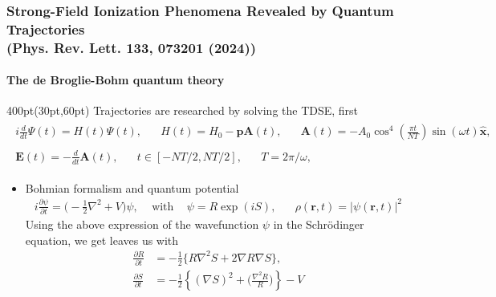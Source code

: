 \begin{frame}
\frametitle{Strong-Field Ionization Phenomena Revealed by Quantum Trajectories \\
\small (Phys. Rev. Lett. \textbf{133}, 073201 (2024))}
\framesubtitle{The de Broglie-Bohm quantum theory}


\footnotesize
 
\begin{textblock*}{400pt}(30pt,60pt)
Trajectories are researched by solving the TDSE, first
\begin{align}
\begin{split}
 i\frac{d}{dt}\Psi(t) = H(t)\Psi(t), 
   \hspace{20pt} H(t) = H_0 - \boldsymbol{p}\boldsymbol{A}(t), \hspace{20pt}
\boldsymbol{A}(t) = -A_0 \cos^4\left(\frac{\pi t}{NT}\right)\sin (\omega t)\boldsymbol{\hat{x}}, 
\end{split}
 \nonumber \\
\begin{split}
\boldsymbol{E}(t) = -\frac{d}{dt}\boldsymbol{A}(t), \hspace{20pt}
 t \in \left[ -NT/2, NT/2 \right], \hspace{20pt} T = 2\pi/\omega, \hspace{20pt}
\end{split} \nonumber
\end{align}
\begin{itemize}
\item Bohmian formalism and quantum potential
\begin{align}
 i\frac{\partial \psi}{\partial t} = \Bigg( -\frac{1}{2}\nabla^2 + V\Bigg)\psi,
\hspace{10pt} \mbox{ with } \hspace{10pt} \psi = R\exp(iS), 
\hspace{20pt} 
\rho(\boldsymbol{r},t) = \left| \psi(\boldsymbol{r},t)\right|^2\nonumber
\end{align}
Using the above expression of the wavefunction $\psi$ in the 
Schr\"odinger equation, we get
leaves us with 
\begin{align}
 \frac{\partial R}{\partial t} &= -\frac{1}{2}
        \Bigg\lbrace R\nabla^2 S +2\nabla R \nabla S \Bigg\rbrace, 
  \nonumber \\
 \frac{\partial S}{\partial t} &= -\frac{1}{2}\left\lbrace (\nabla S)^2 
          + \Bigg( \frac{\nabla^2 R}{R} \Bigg)\right\rbrace - V \nonumber
\end{align}


\end{itemize}
\end{textblock*}
\end{frame}
